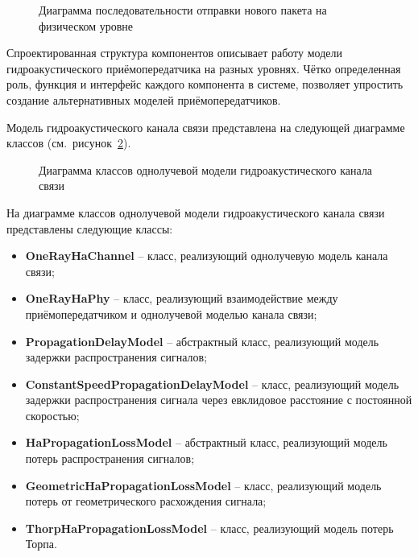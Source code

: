 \documentclass[
    numbers=section,
    document-code={ВКРБ--09.03.04--10.19--XX--26--81}
]{../latex/fqw}
\begin{document}
    \begin{figure}[H]
        \centering
        \fbox{\rule{0pt}{20mm}\rule{40mm}{0pt}}
        \caption{Диаграмма последовательности отправки нового пакета на
        физическом уровне}
        \label{fig:sequence_diagram_of_new_packet_transmission_at_physical_layer}
    \end{figure}

    Спроектированная структура компонентов описывает работу модели
    гидроакустического приёмопередатчика на разных уровнях.
    Чётко определенная роль, функция и интерфейс каждого компонента в системе,
    позволяет упростить создание альтернативных моделей приёмопередатчиков.

    Модель гидроакустического канала связи представлена на следующей диаграмме классов
    (см.~рисунок~\ref{fig:class_diagram_of_single-band_hydroacoustic_communication_channel_model}).

    \begin{figure}[H]
        \centering
        \fbox{\rule{0pt}{20mm}\rule{40mm}{0pt}}
        \caption{Диаграмма классов однолучевой модели гидроакустического канала связи}
        \label{fig:class_diagram_of_single-band_hydroacoustic_communication_channel_model}
    \end{figure}

    На диаграмме классов однолучевой модели гидроакустического канала связи представлены следующие классы:

    \begin{itemize}
        \item \textbf{OneRayHaChannel} -- класс, реализующий однолучевую модель канала связи;
        \item \textbf{OneRayHaPhy} -- класс, реализующий взаимодействие между
        приёмопередатчиком и однолучевой моделью канала связи;
        \item \textbf{PropagationDelayModel} -- абстрактный класс,
        реализующий модель задержки распространения сигналов;
        \item \textbf{ConstantSpeedPropagationDelayModel} -- класс,
        реализующий модель задержки распространения сигнала через евклидовое расстояние с постоянной скоростью;
        \item \textbf{HaPropagationLossModel} -- абстрактный класс, реализующий модель потерь распространения сигналов;
        \item \textbf{GeometricHaPropagationLossModel} -- класс,
        реализующий модель потерь от геометрического расхождения сигнала;
        \item \textbf{ThorpHaPropagationLossModel} -- класс, реализующий модель потерь Торпа.
    \end{itemize}
\end{document}
